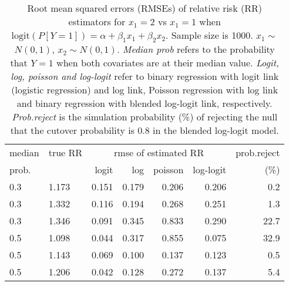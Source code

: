 \documentclass[12pt,a4paper]{article}
\begin{document}
\begin{table}[H] 
\small\sf\centering 
\caption{Root mean squared errors (RMSEs) of relative risk (RR) estimators for $x_1=2$ vs $x_1=1$ when $\mbox{logit}(P[Y=1])=\alpha+\beta_1 x_1 + \beta_2 x_2$. Sample size is 1000. $x_1 \sim $$N(0,1)$, $x_2 \sim N(0,1)$. {\it Median prob} refers to the probability that $Y=1$ when both covariates are at their median value. {\it Logit, log, poisson and log-logit} refer to binary regression with logit link (logistic regression) and log link, Poisson regression with log link and binary regression with blended log-logit link, respectively. {\it Prob.reject} is the simulation probability (\%) of rejecting the null that the cutover probability is $0.8$ in the blended log-logit model.} 
\begin{tabular}{llrrrrr} 
\toprule 
median & true RR & \multicolumn{4}{c}{rmse of estimated RR} & prob.reject \\ 
prob. & & logit & log & poisson & log-logit  & (\%) \\ \midrule 
0.3 & 1.173 & 0.151 & 0.179 & 0.206 & 0.206 &  0.2 \\  
0.3 & 1.332 & 0.116 & 0.194 & 0.268 & 0.251 &  1.3 \\  
0.3 & 1.346 & 0.091 & 0.345 & 0.833 & 0.290 & 22.7 \\  
0.5 & 1.098 & 0.044 & 0.317 & 0.855 & 0.075 & 32.9 \\  
0.5 & 1.143 & 0.069 & 0.100 & 0.137 & 0.123 &  0.5 \\  
0.5 & 1.206 & 0.042 & 0.128 & 0.272 & 0.137 &  5.4 \\  
\bottomrule 
\end{tabular} 
\end{table} 
\end{document}
